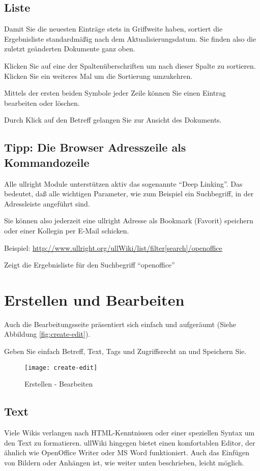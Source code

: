 \documentclass[article, a4paper, oneside, 11pt]{memoir}
\begin{document}
\section{Liste}
Damit Sie die neuesten Einträge stets in Griffweite haben, sortiert die Ergebnisliste standardmäßig nach dem Aktualisierungsdatum. Sie finden also die zuletzt geänderten Dokumente ganz oben.

Klicken Sie auf eine der Spaltenüberschriften um nach dieser Spalte zu sortieren. Klicken Sie ein weiteres Mal um die Sortierung umzukehren.

Mittels der ersten beiden Symbole jeder Zeile können Sie einen Eintrag bearbeiten oder löschen.

Durch Klick auf den Betreff gelangen Sie zur Ansicht des Dokuments.

\section{Tipp: Die Browser Adresszeile als Kommandozeile}
Alle ullright Module unterstützen aktiv das sogenannte "`Deep Linking"'. Das bedeutet, daß alle wichtigen Parameter, wie zum Beispiel ein Suchbegriff, in der Adressleiste angeführt sind.

Sie können also jederzeit eine ullright Adresse als Bookmark (Favorit) speichern oder einer Kollegin per E-Mail schicken.

Beispiel: \url{http://www.ullright.org/ullWiki/list/filter[search]/openoffice}

Zeigt die Ergebnisliste für den Suchbegriff "`openoffice"'




\chapter{Erstellen und Bearbeiten}
Auch die Bearbeitungsseite präsentiert sich einfach und aufgeräumt (Siehe Abbildung \vref{fig:create-edit}).

Geben Sie einfach Betreff, Text, Tags und Zugriffsrecht an und Speichern Sie.

\begin{figure}[htp]
\centering
\texttt{[image: create-edit]}
\caption{Erstellen - Bearbeiten}
\label{fig:create-edit}
\end{figure}


\section{Text}
Viele Wikis verlangen nach HTML-Kenntnissen oder einer speziellen Syntax um den Text zu formatieren. ullWiki hingegen bietet einen komfortablen Editor, der ähnlich wie OpenOffice Writer oder MS Word funktioniert. Auch das Einfügen von Bildern oder Anhängen ist, wie weiter unten beschrieben, leicht möglich.
\end{document}
